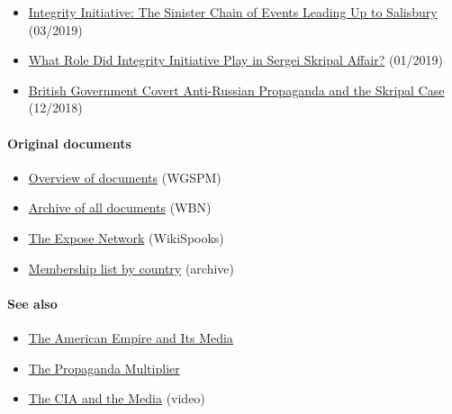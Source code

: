 \begin{itemize}
\tightlist
\item
  \href{https://sputniknews.com/world/201903041072947977-skripal-integrity-initiative-statecraft/}{Integrity
  Initiative: The Sinister Chain of Events Leading Up to Salisbury}
  (03/2019)
\item
  \href{https://sputniknews.com/europe/201901041071225427-skripal-integrity-initiative-miller/}{What
  Role Did Integrity Initiative Play in Sergei Skripal Affair?}
  (01/2019)
\item
  \href{https://www.craigmurray.org.uk/archives/2018/12/british-government-covert-anti-russian-propaganda-and-the-skripal-case/}{British
  Government Covert Anti-Russian Propaganda and the Skripal Case}
  (12/2018)
\end{itemize}

\hypertarget{original-documents}{%
\paragraph{Original documents}\label{original-documents}}

\begin{itemize}
\tightlist
\item
  \href{http://syriapropagandamedia.org/working-papers/briefing-note-on-the-integrity-initiative\#acknowledgements}{Overview
  of documents} (WGSPM)
\item
  \href{https://williambowlesnet.files.wordpress.com/2018/12/IntegrityInitiative.zip}{Archive
  of all documents} (WBN)
\item
  \href{https://wikispooks.com/wiki/EXPOSE_Network}{The Expose Network}
  (WikiSpooks)
\item
  \href{https://www.pdf-archive.com/2018/11/02/xcountry/xcountry.pdf}{Membership
  list by country} (archive)
\end{itemize}

\hypertarget{see-also}{%
\paragraph{See also}\label{see-also}}

\begin{itemize}
\tightlist
\item
  \href{https://swprs.org/the-american-empire-and-its-media/}{The
  American Empire and Its Media}
\item
  \href{https://swprs.org/the-propaganda-multiplier/}{The Propaganda
  Multiplier}
\item
  \href{https://swprs.org/video-the-cia-and-the-media/}{The CIA and the
  Media} (video)
\end{itemize}

